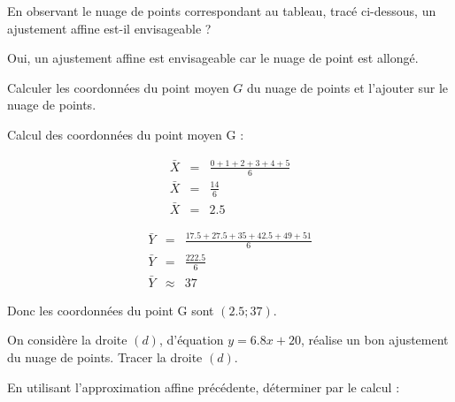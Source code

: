 \begin{questions}
	\question[1] En observant le nuage de points correspondant au tableau, tracé ci-dessous, un ajustement affine est-il envisageable ?
	\begin{solution}
		Oui, un ajustement affine est envisageable car le nuage de point est allongé.
	\end{solution}
	
	\question[1\half] Calculer les coordonnées du point moyen $G$ du nuage de points et l'ajouter sur le nuage de points.
	\begin{solution}
		Calcul des coordonnées du point moyen G :
		
		\begin{eqnarray*}
			\bar{X} &=& \frac{0 + 1 + 2 + 3 + 4 + 5 }{6}\\
			\bar{X} &=& \frac{14}{6}\\
			\bar{X} &=& \num{2.5}
		\end{eqnarray*}
	
		\begin{eqnarray*}
			\bar{Y} &=& \frac{\num{17.5} + \num{27.5} + 35 + \num{42.5} + 49 + 51 }{6}\\
			\bar{Y} &=& \frac{\num{222.5}}{6}\\
			\bar{Y} &\approx& 37			
		\end{eqnarray*}
	
		Donc les coordonnées du point G sont $(\num{2.5}; 37)$.
	\end{solution}
	
	\question[2] On considère la droite $(d)$, d'équation $y = \num{6.8} x + 20$, réalise un bon ajustement du nuage de points. Tracer la droite $(d)$.
	
	\question En utilisant l'approximation affine précédente, déterminer par le calcul :
\end{questions}
